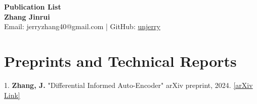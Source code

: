 \documentclass[a4paper,11pt]{article}
\begin{document}
\begin{center}
    {\LARGE \textbf{Publication List}} \\
    \vspace{0.2cm}
    \textbf{Zhang Jinrui} \\
    Email: jerryzhang40@gmail.com | GitHub: \href{https://github.com/unjerry}{unjerry}
\end{center}


\section*{Preprints and Technical Reports}
1. \textbf{Zhang, J.} "Differential Informed Auto-Encoder" arXiv preprint, 2024. \href{https://arxiv.org/abs/2410.18593}{[arXiv Link]}\\

\end{document}
